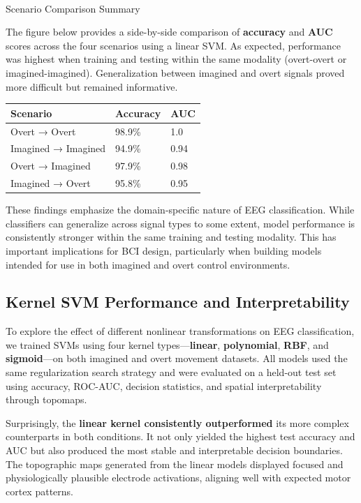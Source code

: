 \documentclass[
  letterpaper,
  DIV=11,
  numbers=noendperiod]{scrartcl}
\makeatletter
\let\oldparagraph\paragraph
\renewcommand{\paragraph}{
    \@ifstar
      \xxxParagraphStar
      \xxxParagraphNoStar
  }
\newcommand{\xxxParagraphStar}[1]{\oldparagraph*{#1}\mbox{}}
\newcommand{\xxxParagraphNoStar}[1]{\oldparagraph{#1}\mbox{}}
\makeatother
\begin{document}
\paragraph{Scenario Comparison
Summary}\label{scenario-comparison-summary}

The figure below provides a side-by-side comparison of \textbf{accuracy}
and \textbf{AUC} scores across the four scenarios using a linear SVM. As
expected, performance was highest when training and testing within the
same modality (overt-overt or imagined-imagined). Generalization between
imagined and overt signals proved more difficult but remained
informative.

\begin{longtable}[]{@{}lll@{}}
\toprule\noalign{}
Scenario & Accuracy & AUC \\
\midrule\noalign{}
\endhead
\bottomrule\noalign{}
\endlastfoot
Overt → Overt & 98.9\% & 1.0 \\
Imagined → Imagined & 94.9\% & 0.94 \\
Overt → Imagined & 97.9\% & 0.98 \\
Imagined → Overt & 95.8\% & 0.95 \\
\end{longtable}

These findings emphasize the domain-specific nature of EEG
classification. While classifiers can generalize across signal types to
some extent, model performance is consistently stronger within the same
training and testing modality. This has important implications for BCI
design, particularly when building models intended for use in both
imagined and overt control environments.

\subsection{Kernel SVM Performance and
Interpretability}\label{kernel-svm-performance-and-interpretability}

To explore the effect of different nonlinear transformations on EEG
classification, we trained SVMs using four kernel
types---\textbf{linear}, \textbf{polynomial}, \textbf{RBF}, and
\textbf{sigmoid}---on both imagined and overt movement datasets. All
models used the same regularization search strategy and were evaluated
on a held-out test set using accuracy, ROC-AUC, decision statistics, and
spatial interpretability through topomaps.

Surprisingly, the \textbf{linear kernel consistently outperformed} its
more complex counterparts in both conditions. It not only yielded the
highest test accuracy and AUC but also produced the most stable and
interpretable decision boundaries. The topographic maps generated from
the linear models displayed focused and physiologically plausible
electrode activations, aligning well with expected motor cortex
patterns.
\end{document}
